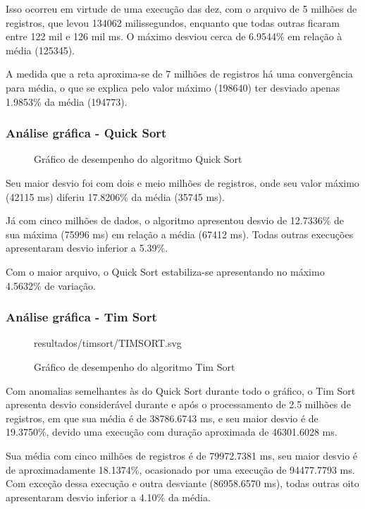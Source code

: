\documentclass[a4paper,12pt]{scrartcl}
\begin{document}
Isso ocorreu em virtude de uma execução das dez, com o arquivo de 5 milhões de registros, que levou 134062 milissegundos, enquanto que todas outras ficaram entre 122 mil e 126 mil ms. O máximo desviou cerca de 6.9544\% em relação à média (125345).

A medida que a reta aproxima-se de 7 milhões de registros há uma convergência para média, o que se explica pelo valor máximo (198640) ter desviado apenas 1.9853\% da média (194773).

\subsubsection{Análise gráfica - Quick Sort}
\begin{figure}[H]
    \centering
    
    \caption{Gráfico de desempenho do algoritmo Quick Sort}
    \label{mapaSelect}
\end{figure}

Seu maior desvio foi com dois e meio milhões de registros, onde seu valor máximo (42115 ms) diferiu 17.8206\% da média (35745 ms).

Já com cinco milhões de dados, o algoritmo apresentou desvio de 12.7336\% de sua máxima (75996 ms) em relação a média (67412 ms). Todas outras execuções apresentaram desvio inferior a 5.39\%.

Com o maior arquivo, o Quick Sort estabiliza-se apresentando no máximo 4.5632\% de variação.


\subsubsection{Análise gráfica - Tim Sort}
\begin{figure}[H]
    \centering
    
    {resultados/timsort/TIMSORT.svg}
    \caption{Gráfico de desempenho do algoritmo Tim Sort}
    \label{mapaSelect}
\end{figure}

Com anomalias semelhantes às do Quick Sort durante todo o gráfico, o Tim Sort apresenta desvio considerável durante e após o processamento de 2.5 milhões de registros, em que sua média é de 38786.6743 ms, e seu maior desvio é de 19.3750\%, devido uma execução com duração aproximada de 46301.6028 ms.

Sua média com cinco milhões de registros é de 79972.7381 ms, seu maior desvio é de aproximadamente 18.1374\%, ocasionado por uma execução de 94477.7793 ms. Com exceção dessa execução e outra desviante (86958.6570 ms), todas outras oito apresentaram desvio inferior a 4.10\% da média.
\end{document}
